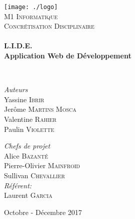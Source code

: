 \begin{titlepage}
\begin{center}

\texttt{[image: ./logo]}~\\[1cm]

\textsc{\LARGE M1 Informatique}\\[1.5cm]

\textsc{\Large Concrétisation Disciplinaire}\\[0.5cm]

\HRule \\[0.4cm]

{\huge \bfseries L.I.D.E.\\
Application Web de Développement \\[0.4cm] }

\HRule \\[1.5cm]

\begin{minipage}{0.4\textwidth}
\begin{flushleft} \large
\emph{Auteurs}\\
Yassine \textsc{Ibrir}\\
Jerôme \textsc{Martins Mosca}\\
Valentine \textsc{Rahier}\\
Paulin \textsc{Violette}\\
\end{flushleft}
\end{minipage}
\begin{minipage}{0.4\textwidth}
\begin{flushright} \large
\emph{Chefs de projet}\\
Alice \textsc{Bazanté}\\
Pierre-Olivier \textsc{Mainfroid}\\
Sullivan \textsc{Chevallier}\\
\emph{Référent:} \\
Laurent \textsc{Garcia}
\end{flushright}
\end{minipage}

\vfill

{\large Octobre - Décembre 2017}

\end{center}
\end{titlepage}